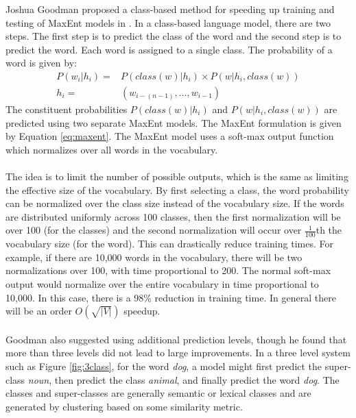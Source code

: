 Joshua Goodman proposed a class-based method for speeding up training and testing of MaxEnt models in \cite{Goodman2001}. In a class-based language model, there are two steps. The first step is to predict the class of the word and the second step is to predict the word. Each word is assigned to a single class. 
The probability of a word is given by:
\begin{align}
P(w_i | h_i)  =&  P(class(w) | h_i) \times P(w|  h_i, class(w))
\\ h_i =& ( w_{i-(n-1)},\dots, w_{i-1} ) \nonumber
\end{align}
The constituent probabilities $P\left(class(w) | h_i \right)$ and $P \left(w|  h_i, class(w) \right)$ are predicted using two separate MaxEnt models. The MaxEnt formulation is given by Equation \ref{eq:maxent}. The MaxEnt model uses a soft-max output function which normalizes over all words in the vocabulary.
\paragraph{}
The idea is to limit the number of possible outputs, which is the same as limiting the effective size of the vocabulary. By first selecting a class, the word probability can be normalized over the class size instead of the vocabulary size. If the words are distributed uniformly across 100 classes, then the first normalization will be over 100 (for the classes) and the second normalization will occur over $\frac{1}{100}$th the vocabulary size (for the word). This can drastically reduce training times. For example, if there are 10,000 words in the vocabulary, there will be two normalizations over 100, with time proportional to 200. The normal soft-max output would normalize over the entire vocabulary in time proportional to 10,000. In this case, there is a 98\% reduction in training time. In general there will be an order $O(\sqrt{|V|})$ speedup.
\paragraph{}
Goodman also suggested using additional prediction levels, though he found that more than three levels did not lead to large improvements. In a three level system such as Figure \ref{fig:3class}, for the word \emph{dog}, a model might first predict the super-class \emph{noun}, then predict the class \emph{animal}, and finally predict the word \emph{dog}. The classes and super-classes are generally semantic or lexical classes and are generated by clustering based on some similarity metric.
